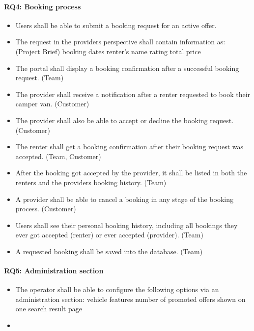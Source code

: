 \paragraph{RQ4: Booking process}
\begin{itemize}
    \item Users shall be able to submit a booking request for an active offer.
    \item The request in the providers perspective shall contain information as: (Project Brief)
        \subitem booking dates
        \subitem renter's name
        \subitem rating
        \subitem total price
    \item The portal shall display a booking confirmation after a successful booking request. (Team)
    \item The provider shall receive a notification after a renter requested to book their camper van. (Customer)
    \item The provider shall also be able to accept or decline the booking request. (Customer)
    \item The renter shall get a booking confirmation after their booking request was accepted. (Team, Customer)
    \item After the booking got accepted by the provider, it shall be listed in both the renters and the providers booking history. (Team)
    \item A provider shall be able to cancel a booking in any stage of the booking process. (Customer)
    \item Users shall see their personal booking history, including all bookings they ever got accepted (renter) or ever accepted (provider).  (Team)
    \item A requested booking shall be saved into the database. (Team)
\end{itemize}

\paragraph{RQ5: Administration section}
\begin{itemize}
    \item The operator shall be able to configure the following options via an administration section:
        \subitem vehicle features
        \subitem number of promoted offers shown on one search result page
    \item
\end{itemize}

